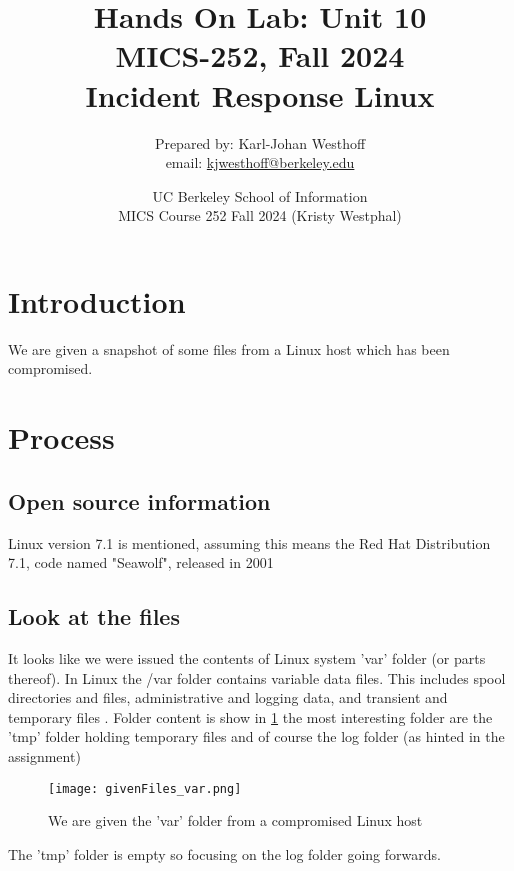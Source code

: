 \documentclass[
	letterpaper, %
	10pt, %
	unnumberedsections, %
	twoside, %
]{APAAssignment}
\title{Hands On Lab: Unit 10 \\ MICS-252, Fall 2024 \\ Incident Response Linux} %
\date{UC Berkeley School of Information \\
MICS Course 252 Fall 2024 (Kristy Westphal)
}
\author{
	Prepared by: Karl-Johan Westhoff \\
	email: \href{mailto:kjwesthoff@berkeley.edu}{kjwesthoff@berkeley.edu}
}
\begin{document}
\onecolumn
\maketitle %



\section{Introduction}
We are given a snapshot of some files from a Linux host which has been compromised.


\section{Process}


\subsection{Open source information}
Linux version 7.1 is mentioned, assuming this means the Red Hat Distribution 7.1, code named "Seawolf", released in 2001 \cite{RedHatOnWIki}




\subsection{Look at the files}
It looks like we were issued the contents of Linux system 'var' folder (or parts thereof). In Linux the /var folder contains variable data files. This includes spool directories and files, administrative and logging data, and transient and temporary files \cite{VarFolder}. Folder content is show in \ref{fig:givenFiles} the most interesting folder are the 'tmp' folder holding temporary files and of course the log folder (as hinted in the assignment)

\begin{figure}[!htp] %
	\centering
	\texttt{[image: givenFiles\_var.png]}
	\caption{We are given the 'var' folder from a compromised Linux host}
	\label{fig:givenFiles}
\end{figure}

The 'tmp' folder is empty so focusing on the log folder going forwards.


\printbibliography %
\end{document}
